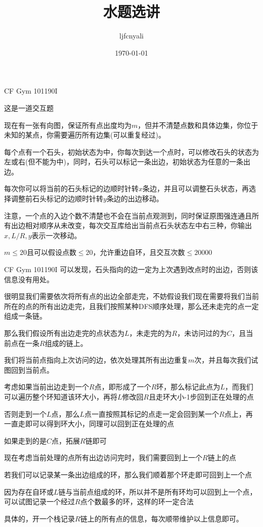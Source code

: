 \documentclass[9pt]{beamer}
\title{水题选讲}
\date{\today}
\author{ljfcnyali}
\begin{document}
  \maketitle
  \begin{frame}{CF Gym 101190I}
    \par{}这是一道交互题
    \par{}现在有一张有向图，保证所有点出度均为$m$，但并不清楚点数和具体边集，你位于未知的某点，你需要遍历所有边集(可以重复经过)。
    \par{}每个点有一个石头，初始状态为中，你每次到达一个点时，可以修改石头的状态为左或右(但不能为中)，同时，石头可以标记一条出边，初始状态为任意的一条出边。
    \par{}每次你可以将当前的石头标记的边顺时针转$x$条边，并且可以调整石头状态，再选择调整前石头标记的边顺时针转$y$条边的出边移动。
    \par{}注意，一个点的入边个数不清楚也不会在当前点观测到，同时保证原图强连通且所有出边相对顺序从未改变，每次交互库给出当前点石头状态左中右三种，你输出$x,L/R,y$表示一次移动。
    \par{}$m\le 20$且可以假设点数$\le 20$，允许重边自环，且交互次数$\le 20000$
  \end{frame}
  \begin{frame}{CF Gym 101190I}
    可以发现，石头指向的边一定为上次遇到改点时的出边，否则该信息没有用处。
    \pause
    
    很明显我们需要依次将所有点的出边全部走完，不妨假设我们现在需要将我们当前所在的点的所有出边走完，且我们按照某种DFS顺序处理，那么还未走完的点一定组成一条链。
    \pause
    
    那么我们假设所有出边走完的点状态为$L$，未走完的为$R$，未访问过的为$C$，且当前点在一条$R$组成的链上。
    \pause

    我们将当前点指向上次访问的边，依次处理其所有出边重复$m$次，并且每次我们试图回到当前点。
    \pause

    考虑如果当前出边走到一个$R$点，即形成了一个$R$环，那么标记此点为$L$，而我们可以遍历整个环知道该环大小，再将$L$修改回$R$且走环大小-1步回到正在处理的点
    \pause

    否则走到一个$L$点，那么$L$点一直按照其标记的点走一定会回到某一个$R$点上，再一直走即可以得到环大小，同理可以回到正在处理的点
    \pause

    如果走到的是$C$点，拓展$R$链即可
  \end{frame}
  \begin{frame}
    现在考虑当前处理的点所有出边访问完时，我们需要回到上一个$R$链上的点
    \pause

    若我们可以记录某一条出边组成的环，那么我们顺着那个环走即可回到上一个点
    \pause

    因为存在自环或$L$链与当前点组成的环，所以并不是所有环均可以回到上一个点，可以试图记录一个经过$R$点个数最多的环，这样的环一定合法
    \pause

    具体的，开一个栈记录$R$链上的所有点的信息，每次顺带维护以上信息即可。
  \end{frame}
\end{document}
